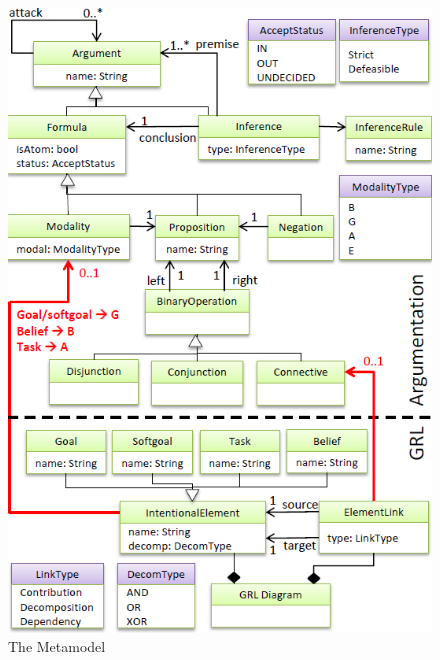 \begin{figure}[h!]
\includegraphics[scale=0.61]{img/metamodelimg}
\caption{The Metamodel }
\label{fig:metamodel}
\end{figure}